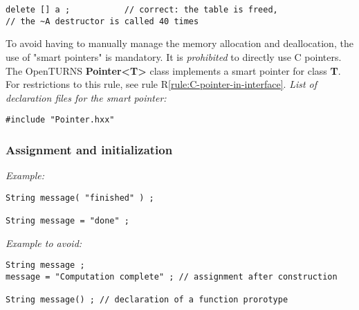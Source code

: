 \begin{lstlisting}[frame=RLB]
delete [] a ;           // correct: the table is freed,
// the ~A destructor is called 40 times
\end{lstlisting}

{To avoid having to manually manage the memory allocation and deallocation, the use of "smart pointers" is mandatory. It is \emph{prohibited} to directly use C pointers. The OpenTURNS {\bf Pointer<T>} class implements a smart pointer for class {\bf T}. For restrictions to this rule, see rule R\ref{rule:C-pointer-in-interface}.
}
\emph{List of declaration files for the smart pointer:}
\lstset{language=C++, basicstyle=\normalsize}
\begin{lstlisting}[frame=TBRL]
#include "Pointer.hxx"
\end{lstlisting}



\subsubsection{Assignment and initialization}


\emph{Example:}
\begin{lstlisting}[frame=TBRL]
String message( "finished" ) ;

String message = "done" ;
\end{lstlisting}

\emph{Example to avoid:}
\begin{lstlisting}[frame=TBRL]
String message ;
message = "Computation complete" ; // assignment after construction

String message() ; // declaration of a function prorotype
\end{lstlisting}


